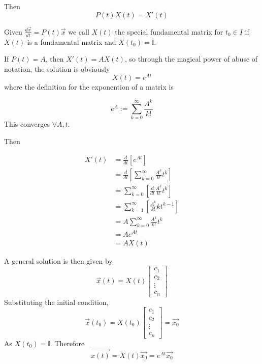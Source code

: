 \documentclass[12pt]{article}
\begin{document}
Then
$$P(t)X(t) = X'(t)$$

\begin{defn}
	Given $\frac{d\vec{x}}{dt} = P(t)\vec{x}$ we call $X(t)$ the special fundamental matrix for $t_0\in I$ if $X(t)$ is a fundamental matrix and $X(t_0) = \mathbb{I}$.
\end{defn}

If $P(t) = A$, then $X'(t) = AX(t)$, so through the magical power of abuse of notation, the solution is obviously
$$X(t) = e^{At}$$
where the definition for the exponention of a matrix is

\begin{defn}
	$$e^A := \sum_{k=0}^\infty \frac{A^k}{k!}$$
	This converges $\forall A, t$.
\end{defn}

Then

\begin{align*}
	X'(t) &= \frac{d}{dt}\left[e^{At}\right] \\
	      &= \frac{d}{dt} \left[\sum_{k=0}^\infty \frac{A^k}{k!}t^k\right] \\
	      &= \sum_{k=0}^\infty\left[\frac{d}{dt} \frac{A^k}{k!}t^k\right] \\
	      &= \sum_{k=1}^\infty\left[\frac{A^k}{k!}kt^{k-1}\right] \\
	      &= A\sum_{k=0}^\infty \frac{A^k}{k!}t^k \\
	      &= Ae^{At} \\
	      &= AX(t)
\end{align*}

A general solution is then given by
$$\vec{x}(t) = X(t)\begin{bmatrix} c_1 \\ c_2 \\ \vdots \\ c_n\end{bmatrix}$$
Substituting the initial condition,
$$\vec{x}(t_0) = X(t_0)\begin{bmatrix} c_1 \\ c_2 \\ \vdots \\ c_n\end{bmatrix} = \vec{x_0}$$
As $X(t_0) = \mathbb{I}$. Therefore
$$\vec{x(t)} = X(t)\vec{x_0} = e^{At}\vec{x_0}$$
\end{document}

